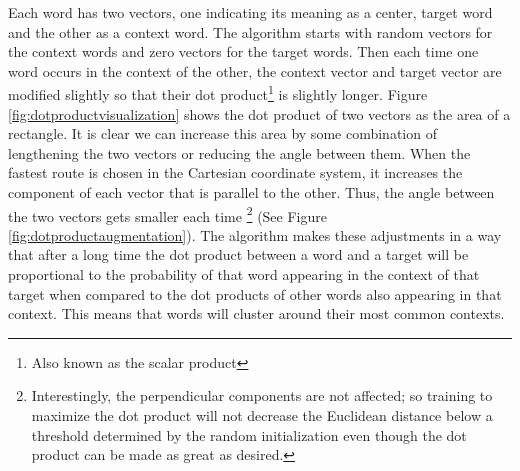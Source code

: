 Each word has two vectors, one indicating its meaning as a center, target word 
and the other as a context word. The algorithm starts with random vectors for 
the context words and zero vectors for the target words. Then 
each time one word occurs in the context of the other, the context vector and 
target vector are modified slightly so that their dot product\footnote{Also 
known as the scalar product} is slightly longer. Figure 
\ref{fig:dotproductvisualization} shows the dot product of two vectors as the 
area of a rectangle. It is clear we can increase this area by some combination 
of lengthening the two vectors or reducing the angle between them. 
When the fastest route is chosen in the Cartesian coordinate system, it
increases the component of each vector that is parallel to the other. Thus, the
angle between the two vectors gets smaller each time
\footnote{Interestingly, the perpendicular components are not affected; so 
training to maximize the dot product will not decrease the Euclidean distance
below a threshold determined by the random initialization even though the
dot product can be made as great as desired.} (See Figure 
\ref{fig:dotproductaugmentation}).
The algorithm 
makes these adjustments in a way that after a long time the dot product
between a word and a target will be proportional to the probability of that word 
appearing in the context of that target when compared to the dot products of
other words also appearing in that context. This means that words will cluster
around their most common contexts.

